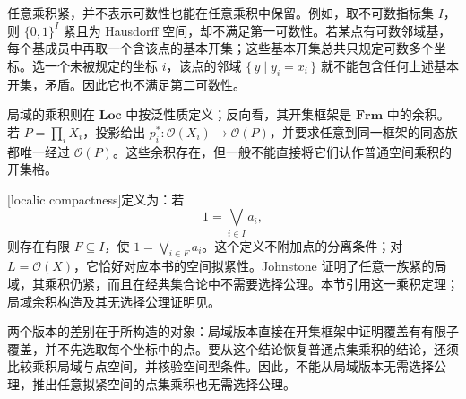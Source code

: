 任意乘积紧，并不表示可数性也能在任意乘积中保留。例如，取不可数指标集 \(I\)，则 \(\{0,1\}^I\) 紧且为 Hausdorff 空间，却不满足第一可数性。若某点有可数邻域基，每个基成员中再取一个含该点的基本开集；这些基本开集总共只规定可数多个坐标。选一个未被规定的坐标 \(i\)，该点的邻域 \(\{\,y\mid y_i=x_i\,\}\) 就不能包含任何上述基本开集，矛盾。因此它也不满足第二可数性。

\ProseParagraphBreak
局域的乘积则在 \(\mathbf{Loc}\) 中按泛性质定义；反向看，其开集框架是 \(\mathbf{Frm}\) 中的余积。若 \(P=\prod_iX_i\)，投影给出 \(p_i^*:\mathcal O(X_i)\to\mathcal O(P)\)，并要求任意到同一框架的同态族都唯一经过 \(\mathcal O(P)\)。这些余积存在，但一般不能直接将它们认作普通空间乘积的开集格。

\ProseParagraphBreak
{}[localic compactness]定义为：若
\[
	1=\bigvee_{i\in I}a_i,
\]
则存在有限 \(F\subseteq I\)，使 \(1=\bigvee_{i\in F}a_i\)。这个定义不附加点的分离条件；对 \(L=\mathcal O(X)\)，它恰好对应本书的空间拟紧性。Johnstone 证明了任意一族紧的局域，其乘积仍紧，而且在经典集合论中不需要选择公理。本节引用这一乘积定理；局域余积构造及其无选择公理证明见\cite[Proposition 1.2, p. 24; Section 2, Theorem 2.7, pp. 25--26; Section 3, pp. 26--27]{Johnstone1981LocalicTychonoff}。

\ProseParagraphBreak
两个版本的差别在于所构造的对象：局域版本直接在开集框架中证明覆盖有有限子覆盖，并不先选取每个坐标中的点。要从这个结论恢复普通点集乘积的结论，还须比较乘积局域与点空间，并核验空间型条件。因此，不能从局域版本无需选择公理，推出任意拟紧空间的点集乘积也无需选择公理。
